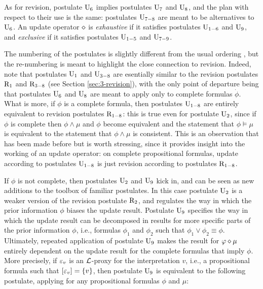 As for revision, postulate $\mathrm{U}_{6}$ implies postulates $\mathrm{U}_{7}$ and $\mathrm{U}_{8}$,
and the plan with respect to their use is the same:
postulates $\mathrm{U}_{7-8}$ are meant to be alternatives to $\mathrm{U}_{6}$.
An update operator $\diamond$ is \emph{exhaustive} if it satisfies postulates $\mathrm{U}_{1-6}$ and $\mathrm{U}_{9}$,
and \emph{exclusive} if it satisfies postulates $\mathrm{U}_{1-5}$ and $\mathrm{U}_{7-9}$.

The numbering of the postulates is slightly different from the usual ordering 
\cite{KatsunoM91}, but the re-numbering is meant to highlight the close connection
to revision.
Indeed, note that postulates $\mathrm{U}_{1}$ and $\mathrm{U}_{3-8}$ are
esentially similar to the revision postulates $\mathrm{R}_{1}$ and $\mathrm{R}_{3-8}$
(see Section \ref{sec:3-revision}), with the only point of departure 
being that postulates $\mathrm{U}_{6}$ and $\mathrm{U}_{8}$ are meant to apply only 
to complete formulas $\dot{\phi}$.
What is more, if $\phi$ is a complete formula,
then postulates $\mathrm{U}_{1-8}$ are entirely 
equivalent to revision postulates
$\mathrm{R}_{1-8}$: this is true even for postulate $\mathrm{U}_{2}$,
since if $\phi$ is complete then 
$\phi\land\mu$ and $\phi$ become equivalent
and the statement that $\phi\models\mu$
is equivalent to the statement that $\phi\land\mu$ is consistent.
This is an observation that has been made before \cite{PeppasNPFKP96}
but is worth stressing, since it provides 
insight into the working of an update operator:
on complete propositional formulas,
update according to postulates $\mathrm{U}_{1-8}$
is just revision according to postulates $\mathrm{R}_{1-8}$.

If $\phi$ is not complete, 
then postulates $\mathrm{U}_{2}$ and $\mathrm{U}_{9}$
kick in, and can be seen as new additions
to the toolbox of familiar postulates.
In this case postulate $\mathrm{U}_{2}$ is a weaker version of the revision postulate
$\mathrm{R}_{2}$, and regulates the way in which the prior information $\phi$
biases the update result.
Postulate $\mathrm{U}_{9}$ specifies the way in which the update result
can be decomposed in results for more specific parts of the prior information $\phi$,
i.e., formulas $\phi_{1}$ and $\phi_{2}$
such that $\phi_{1}\lor \phi_{2}\equiv \phi$.
Ultimately, repeated application of postulate $\mathrm{U}_{9}$ makes the result
for $\varphi\diamond\mu$
entirely dependent on the update result for the complete formulas
that imply $\phi$.
More precisely, if $\varepsilon_v$ is an $\mathcal{L}$-proxy for the interpretation $v$,
i.e., a propositional formula such that $[\varepsilon_v]=\{v\}$,
then postulate $\mathrm{U}_{9}$ is equivalent to the following postulate, 
applying for any propositional formulas $\phi$ and $\mu$:

